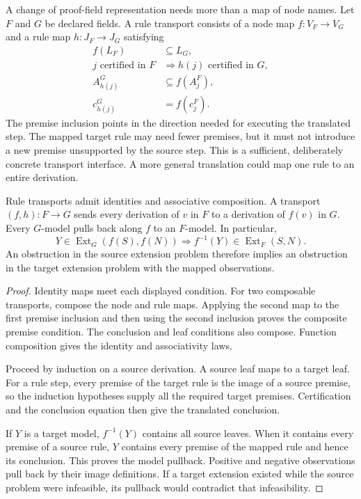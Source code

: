 A change of proof-field representation needs more than a map of node names. Let $F$ and $G$ be declared fields. A rule transport consists of a node map $f:V_F\to V_G$ and a rule map $h:J_F\to J_G$ satisfying
\[
\begin{aligned}
 f(L_F)&\subseteq L_G,\\
 j\text{ certified in }F&\Longrightarrow h(j)\text{ certified in }G,\\
 A^G_{h(j)}&\subseteq f(A^F_j),\\
 c^G_{h(j)}&=f(c^F_j).
\end{aligned}
\]
The premise inclusion points in the direction needed for executing the translated step. The mapped target rule may need fewer premises, but it must not introduce a new premise unsupported by the source step. This is a sufficient, deliberately concrete transport interface. A more general translation could map one rule to an entire derivation.

\begin{PPTtheorem}
\label{PPT:res:new:transport}
Rule transports admit identities and associative composition. A transport $(f,h):F\to G$ sends every derivation of $v$ in $F$ to a derivation of $f(v)$ in $G$. Every $G$-model pulls back along $f$ to an $F$-model. In particular,
\[
 Y\in\operatorname{Ext}_G(f(S),f(N))
   \Longrightarrow f^{-1}(Y)\in\operatorname{Ext}_F(S,N).
\]
An obstruction in the source extension problem therefore implies an obstruction in the target extension problem with the mapped observations.
\end{PPTtheorem}
\begin{proof}
Identity maps meet each displayed condition. For two composable transports, compose the node and rule maps. Applying the second map to the first premise inclusion and then using the second inclusion proves the composite premise condition. The conclusion and leaf conditions also compose. Function composition gives the identity and associativity laws.

Proceed by induction on a source derivation. A source leaf maps to a target leaf. For a rule step, every premise of the target rule is the image of a source premise, so the induction hypotheses supply all the required target premises. Certification and the conclusion equation then give the translated conclusion.

If $Y$ is a target model, $f^{-1}(Y)$ contains all source leaves. When it contains every premise of a source rule, $Y$ contains every premise of the mapped rule and hence its conclusion. This proves the model pullback. Positive and negative observations pull back by their image definitions. If a target extension existed while the source problem were infeasible, its pullback would contradict that infeasibility.
\end{proof}

